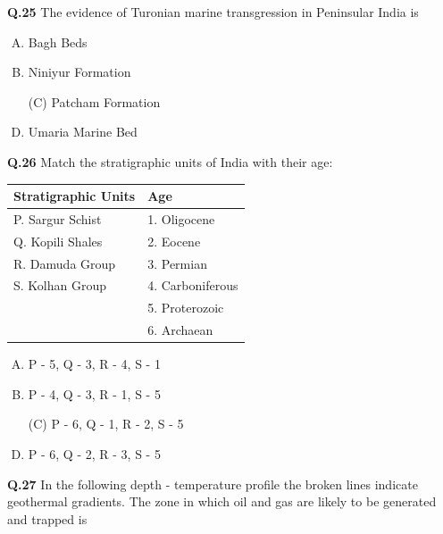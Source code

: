 \textbf{Q.25} The evidence of Turonian marine transgression in Peninsular India is
\begin{enumerate}[(A)]
\item Bagh Beds \item  Niniyur Formation
\item[(C)] Patcham Formation \item  Umaria Marine Bed
\end{enumerate}

\textbf{Q.26} Match the stratigraphic units of India with their age:

\begin{center}
\begin{tabular}{ll}
Stratigraphic Units & Age \\
\hline
P. Sargur Schist & 1. Oligocene \\
Q. Kopili Shales & 2. Eocene \\
R. Damuda Group & 3. Permian \\
S. Kolhan Group & 4. Carboniferous \\
& 5. Proterozoic \\
& 6. Archaean \\
\end{tabular}
\end{center}

\begin{enumerate}[(A)]
\item P - 5, Q - 3, R - 4, S - 1 \item  P - 4, Q - 3, R - 1, S - 5
\item[(C)] P - 6, Q - 1, R - 2, S - 5 \item  P - 6, Q - 2, R - 3, S - 5
\end{enumerate}

\textbf{Q.27} In the following depth - temperature profile the broken lines indicate geothermal gradients. The zone in which oil and gas are likely to be generated and trapped is

